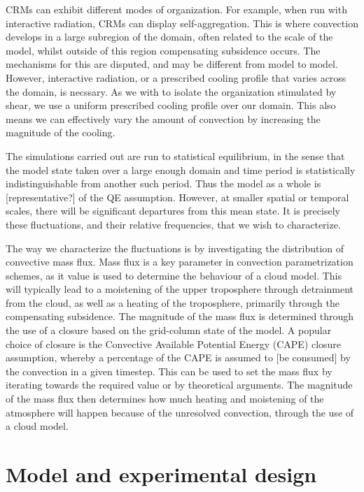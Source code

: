 \documentclass[11pt,a4paper]{article}
\begin{document}
CRMs can exhibit different modes of organization. For example, when run with interactive radiation, CRMs can display self-aggregation. This is where convection develops in a large subregion of the domain, often related to the scale of the model, whilst outside of this region compensating subsidence occurs. The mechanisms for this are disputed, and may be different from model to model. However, interactive radiation, or a prescribed cooling profile that varies across the domain, is necssary. As we with to isolate the organization stimulated by shear, we use a uniform prescribed cooling profile over our domain. This also means we can effectively vary the amount of convection by increasing the magnitude of the cooling.

The simulations carried out are run to statistical equilibrium, in the sense that the model state taken over a large enough domain and time period is statistically indistinguishable from another such period. Thus the model as a whole is [representative?] of the QE assumption. However, at smaller spatial or temporal scales, there will be significant departures from this mean state. It is precisely these fluctuations, and their relative frequencies, that we wish to characterize.

The way we characterize the fluctuations is by investigating the distribution of convective mass flux. Mass flux is a key parameter in convection parametrization schemes, as it value is used to determine the behaviour of a cloud model. This will typically lead to a moistening of the upper troposphere through detrainment from the cloud, as well as a heating of the troposphere, primarily through the compensating subsidence. The magnitude of the mass flux is determined through the use of a closure based on the grid-column state of the model. A popular choice of closure is the Convective Available Potential Energy (CAPE) closure assumption, whereby a percentage of the CAPE is assumed to [be consumed] by the convection in a given timestep. This can be used to set the mass flux by iterating towards the required value or by theoretical arguments. The magnitude of the mass flux then determines how much heating and moistening of the atmosphere will happen because of the unresolved convection, through the use of a cloud model.

\section{Model and experimental design}
\end{document}
